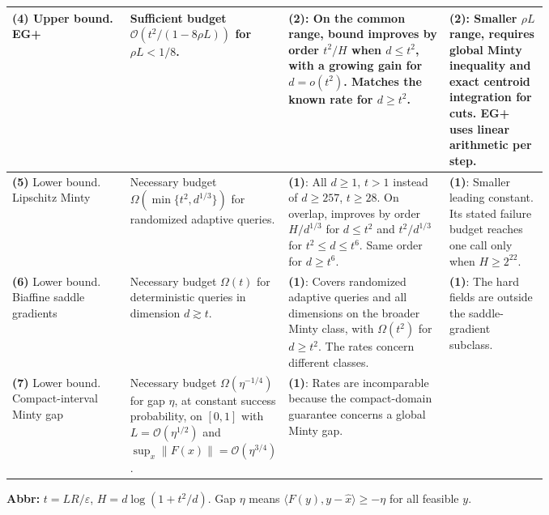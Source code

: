 \begin{table}[tp]
\begin{threeparttable}
\begin{tabularx}{\linewidth}{@{}>{\raggedright\arraybackslash}p{0.22\linewidth}>{\raggedright\arraybackslash}p{0.25\linewidth}>{\raggedright\arraybackslash}p{0.30\linewidth}>{\raggedright\arraybackslash}X@{}}
\midrule
\textbf{(4)} Upper bound. EG+ \citep[Thm.~3.2]{ewmDDJ2021Verified} & Sufficient budget $\mathcal{O}(t^2/(1-8\rho L))$ for $\rho L<1/8$. & \textbf{(2)}: On the common range, bound improves by order $t^2/H$ when $d\le t^2$, with a growing gain for $d=o(t^2)$. Matches the known rate for $d\ge t^2$. & \textbf{(2)}: Smaller $\rho L$ range, requires global Minty inequality and exact centroid integration for cuts. EG+ uses linear arithmetic per step. \\
\midrule
\textbf{(5)} Lower bound. Lipschitz Minty \citep{hdwmEuclidean2026} & Necessary budget $\Omega(\min\{t^2,d^{1/3}\})$ for randomized adaptive queries. & \textbf{(1)}: All $d\ge1$, $t>1$ instead of $d\ge257$, $t\ge28$. On overlap, improves by order $H/d^{1/3}$ for $d\le t^2$ and $t^2/d^{1/3}$ for $t^2\le d\le t^6$. Same order for $d\ge t^6$. & \textbf{(1)}: Smaller leading constant. Its stated failure budget reaches one call only when $H\ge2^{22}$. \\
\midrule
\textbf{(6)} Lower bound. Biaffine saddle gradients \citep[Thm.~4]{ewmYoonRyu2021Verified} & Necessary budget $\Omega(t)$ for deterministic queries in dimension $d\gtrsim t$. & \textbf{(1)}: Covers randomized adaptive queries and all dimensions on the broader Minty class, with $\Omega(t^2)$ for $d\ge t^2$. The rates concern different classes. & \textbf{(1)}: The hard fields are outside the saddle-gradient subclass. \\
\midrule
\textbf{(7)} Lower bound. Compact-interval Minty gap \citep[Cor.~6.9]{fdwmAnagnostidesV4} & Necessary budget $\Omega(\eta^{-1/4})$ for gap $\eta$, at constant success probability, on $[0,1]$ with $L=\mathcal{O}(\eta^{1/2})$ and $\sup_x\|F(x)\|=\mathcal{O}(\eta^{3/4})$. & \textbf{(1)}: Rates are incomparable because the compact-domain guarantee concerns a global Minty gap. & \\
\bottomrule
\end{tabularx}
\begin{tablenotes}[flushleft]\footnotesize
\item[] \textbf{Abbr:} $t=LR/\varepsilon$, $H=d\log(1+t^2/d)$. Gap $\eta$ means $\langle F(y),y-\hat x\rangle\ge-\eta$ for all feasible $y$.
\end{tablenotes}
\end{threeparttable}
\end{table}

